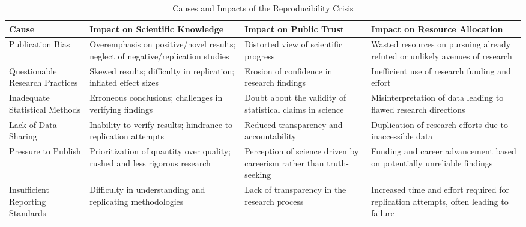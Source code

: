 \begin{table}[ht]
    \centering
    \caption{Causes and Impacts of the Reproducibility Crisis}
    \label{table:reproducibility_crisis} %
    \begin{tabularx}{\textwidth}{|X|X|X|X|}
        \hline
        Cause                                            & Impact on Scientific Knowledge                                                  & Impact on Public Trust                                              & Impact on Resource Allocation                                                                           \\
        \hline
        Publication Bias                                 & Overemphasis on positive/novel results; neglect of negative/replication studies & Distorted view of scientific progress                               & Wasted resources on pursuing already refuted or unlikely avenues of research                            \\
        \hline
        Questionable Research Practices                  & Skewed results; difficulty in replication; inflated effect sizes                & Erosion of confidence in research findings                          & Inefficient use of research funding and effort                                                          \\
        \hline
        Inadequate Statistical Methods                   & Erroneous conclusions; challenges in verifying findings                         & Doubt about the validity of statistical claims in science           & Misinterpretation of data leading to flawed research directions                                         \\
        \hline
        Lack of Data Sharing                             & Inability to verify results; hindrance to replication attempts                  & Reduced transparency and accountability                             & Duplication of research efforts due to inaccessible data                                                \\
        \hline
        Pressure to Publish                              & Prioritization of quantity over quality; rushed and less rigorous research      & Perception of science driven by careerism rather than truth-seeking & Funding and career advancement based on potentially unreliable findings                                 \\
        \hline
        Insufficient Reporting Standards                 & Difficulty in understanding and replicating methodologies                       & Lack of transparency in the research process                        & Increased time and effort required for replication attempts, often leading to failure                   \\

\end{tabularx}
\end{table}
